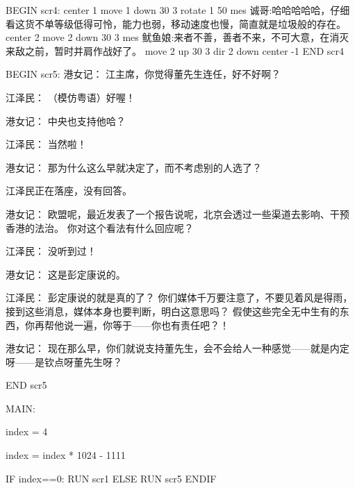 BEGIN scr4:
   center 1
   move 1 down 30 3
   rotate 1 50
   mes 诚哥:哈哈哈哈哈，仔细看这货不单等级低得可怜，能力也弱，移动速度也慢，简直就是垃圾般的存在。
   center 2
   move 2 down 30 3
   mes 鱿鱼娘:来者不善，善者不来，不可大意，在消灭来敌之前，暂时并肩作战好了。
   move 2 up 30 3
   dir 2 down
   center -1
END scr4

BEGIN scr5:
     港女记： 江主席，你觉得董先生连任，好不好啊？

     江泽民： （模仿粤语）好喔！

     港女记： 中央也支持他哈？

     江泽民： 当然啦！

     港女记： 那为什么这么早就决定了，而不考虑别的人选了？

     江泽民正在落座，没有回答。

     港女记： 欧盟呢，最近发表了一个报告说呢，北京会透过一些渠道去影响、干预香港的法治。 你对这个看法有什么回应呢？

     江泽民： 没听到过！

     港女记： 这是彭定康说的。

     江泽民： 彭定康说的就是真的了？ 你们媒体千万要注意了，不要见着风是得雨，接到这些消息，媒体本身也要判断，明白这意思吗？ 假使这些完全无中生有的东西，你再帮他说一遍，你等于——你也有责任吧？！

     港女记： 现在那么早，你们就说支持董先生，会不会给人一种感觉——就是内定呀——是钦点呀董先生呀？

END scr5

MAIN:

index = 4

index = index * 1024 - 1111

IF index==0:
 RUN scr1
ELSE
 RUN scr5
ENDIF